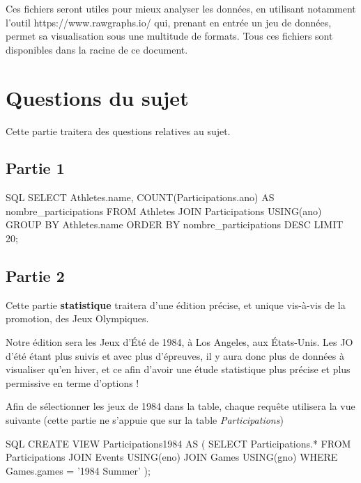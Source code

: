 \documentclass{mytex}
\begin{document}
Ces fichiers seront utiles pour mieux analyser les données, en utilisant notamment l'outil https://www.rawgraphs.io/ qui, prenant en entrée un jeu de données, permet sa visualisation sous une multitude de formats.
Tous ces fichiers sont disponibles dans la racine de ce document.

\section{Questions du sujet}

Cette partie traitera des questions relatives au sujet.

\subsection{Partie 1}


\begin{codeboxlang}[title=20 athlètes affichant le plus de participations]{SQL}
	SELECT Athletes.name, COUNT(Participations.ano) AS nombre_participations
	FROM Athletes JOIN Participations USING(ano)
	GROUP BY Athletes.name
	ORDER BY nombre_participations DESC
	LIMIT 20;
\end{codeboxlang}


\subsection{Partie 2}

Cette partie \textbf{statistique} traitera d'une édition précise, et unique vis-à-vis de la promotion, des Jeux Olympiques.

Notre édition sera les Jeux d'Été de 1984, à Los Angeles, aux États-Unis.
Les JO d'été étant plus suivis et avec plus d'épreuves, il y aura donc plus de données à visualiser qu'en hiver, et ce afin d'avoir une étude statistique plus précise et plus permissive en terme d'options !


Afin de sélectionner les jeux de 1984 dans la table, chaque requête utilisera la vue suivante (cette partie ne s'appuie que sur la table \emph{Participations})

\begin{codeboxlang}[title=Vue exclusive à 1984]{SQL}
	CREATE VIEW Participations1984 AS (
		SELECT Participations.* 
		FROM Participations
		JOIN Events USING(eno)
		JOIN Games USING(gno)
		WHERE Games.games = '1984 Summer'
	);
\end{codeboxlang}
\end{document}
